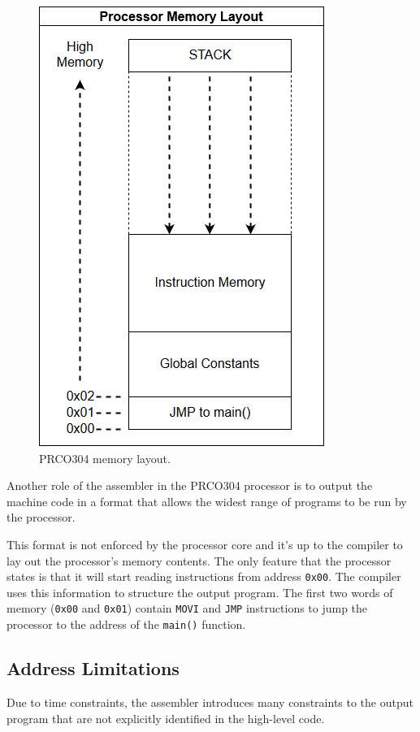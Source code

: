 \documentclass[11pt,a4paper]{report}
\newcommand{\scname}{PRCO304}
\begin{document}
\begin{figure}[H]
\begin{center}
\includegraphics[scale=0.4]{prco_memory_layout}
\end{center}
\caption{\scname{} memory layout.}
\label{fig:asm_mem_layout}
\end{figure}

Another role of the assembler in the \scname{} processor is to output the machine code in a format that allows the widest range of programs to be run by the processor.

This format is not enforced by the processor core and it's up to the compiler to lay out the processor's memory contents. The only feature that the processor states is that it will start reading instructions from address \verb|0x00|. The compiler uses this information to structure the output program. The first two words of memory (\verb|0x00| and \verb|0x01|) contain \verb|MOVI| and \verb|JMP| instructions to jump the processor to the address of the \verb|main()| function.

\subsection{Address Limitations}
Due to time constraints, the assembler introduces many constraints to the output program that are not explicitly identified in the high-level code.
\end{document}
